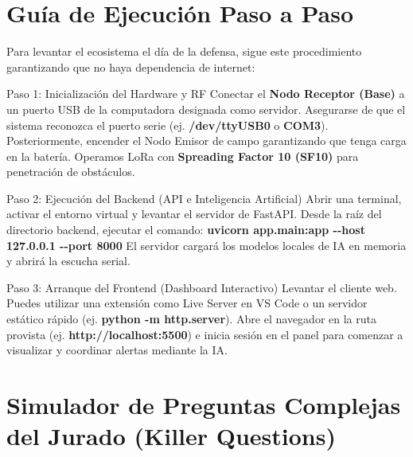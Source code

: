 \documentclass[10pt,letterpaper]{article}
\newcommand{\sectionicon}[1]{\textcolor{cyan}{#1}\enspace}
\begin{document}
\section*{\sectionicon{\faPlayCircle}Guía de Ejecución Paso a Paso}
\justifying
Para levantar el ecosistema el día de la defensa, sigue este procedimiento garantizando que no haya dependencia de internet:

\begin{techbox}{Paso 1: Inicialización del Hardware y RF}
\small\justifying
Conectar el \textbf{Nodo Receptor (Base)} a un puerto USB de la computadora designada como servidor. Asegurarse de que el sistema reconozca el puerto serie (ej. \textbf{/dev/ttyUSB0} o \textbf{COM3}). Posteriormente, encender el Nodo Emisor de campo garantizando que tenga carga en la batería. Operamos LoRa con \textbf{Spreading Factor 10 (SF10)} para penetración de obstáculos.
\end{techbox}

\begin{techbox}{Paso 2: Ejecución del Backend (API e Inteligencia Artificial)}
\small\justifying
Abrir una terminal, activar el entorno virtual y levantar el servidor de FastAPI. Desde la raíz del directorio backend, ejecutar el comando: \newline \textbf{uvicorn app.main:app -\relax-host 127.0.0.1 -\relax-port 8000} \newline El servidor cargará los modelos locales de IA en memoria y abrirá la escucha serial.
\end{techbox}

\begin{techbox}{Paso 3: Arranque del Frontend (Dashboard Interactivo)}
\small\justifying
Levantar el cliente web. Puedes utilizar una extensión como Live Server en VS Code o un servidor estático rápido (ej. \textbf{python -m http.server}). Abre el navegador en la ruta provista (ej. \textbf{http://localhost:5500}) e inicia sesión en el panel para comenzar a visualizar y coordinar alertas mediante la IA.
\end{techbox}

\section*{\sectionicon{\faQuestionCircle}Simulador de Preguntas Complejas del Jurado (Killer Questions)}
\justifying

\vspace{1mm}
\end{document}

